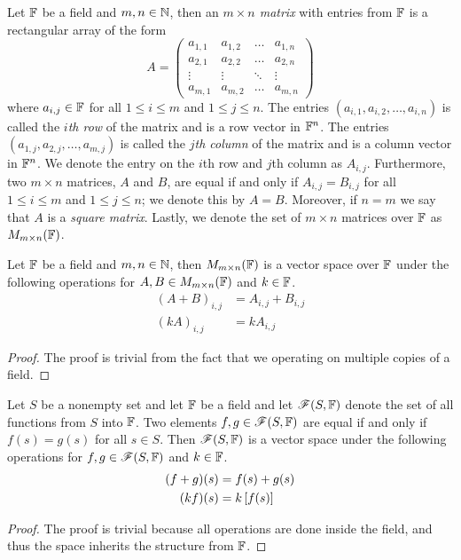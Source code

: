 \begin{definition}[Matrix]
	Let $\mathbb{F}$ be a field and $m,n\in\mathbb{N}$, then an \textit{$m\times n$ matrix} with entries from $\mathbb{F}$ is a rectangular array of the form
	\[
		A=
		\begin{pmatrix}
			a_{1,1} & a_{1,2} & \ldots & a_{1,n}\\
			a_{2,1} & a_{2,2} & \ldots & a_{2,n}\\
			\vdots & \vdots & \ddots & \vdots\\
			a_{m,1} & a_{m,2} & \ldots & a_{m,n}
		\end{pmatrix}
	\]
	where $a_{i,j}\in\mathbb{F}$ for all $1\leq i \leq m$ and $1\leq j \leq n$.
	The entries $(a_{i,1},a_{i,2},\ldots,a_{i,n})$ is called the \textit{$i$th row} of the matrix and is a row vector in $\mathbb{F}^n$.
	The entries $(a_{1,j},a_{2,j},\ldots,a_{m,j})$ is called the \textit{$j$th column} of the matrix and is a column vector in $\mathbb{F}^n$.
	We denote the entry on the $i$th row and $j$th column as $A_{i,j}$.
	Furthermore, two $m\times n$ matrices, $A$ and $B$, are equal if and only if $A_{i,j}=B_{i,j}$ for all $1\leq i\leq m$ and $1\leq j\leq n$; we denote this by $A=B$.
	Moreover, if $n=m$ we say that $A$ is a \textit{square matrix}.
	Lastly, we denote the set of $m\times n$ matrices over $\mathbb{F}$ as $M_{m\times n}(\mathbb{F})$.
\end{definition}

\begin{example}
	Let $\mathbb{F}$ be a field and $m,n\in\mathbb{N}$, then $M_{m\times n}(\mathbb{F})$ is a vector space over $\mathbb{F}$ under the following operations for $A,B\in M_{m\times n}(\mathbb{F})$ and $k\in\mathbb{F}$.
	\begin{align*}
		(A+B)_{i,j}&=A_{i,j}+B_{i,j}\\
		(kA)_{i,j}&=kA_{i,j}
	\end{align*}
\end{example}
\begin{proof}
	The proof is trivial from the fact that we operating on multiple copies of a field.
\end{proof}

\begin{example}
	Let $S$ be a nonempty set and let $\mathbb{F}$ be a field and let $\mathscr{F}(S,\mathbb{F})$ denote the set of all functions from $S$ into $\mathbb{F}$.
	Two elements $f,g\in\mathscr{F}(S,\mathbb{F})$ are equal if and only if $f(s)=g(s)$ for all $s\in S$.
	Then $\mathscr{F}(S,\mathbb{F})$ is a vector space under the following operations for $f,g\in\mathscr{F}(S,\mathbb{F})$ and $k\in\mathbb{F}$.
	\begin{align*}
		(f+g)(s)&=f(s)+g(s)\\
		(kf)(s)&=k\left[ f(s) \right]
	\end{align*}
\end{example}
\begin{proof}
	The proof is trivial because all operations are done inside the field, and thus the space inherits the structure from $\mathbb{F}$.
\end{proof}

